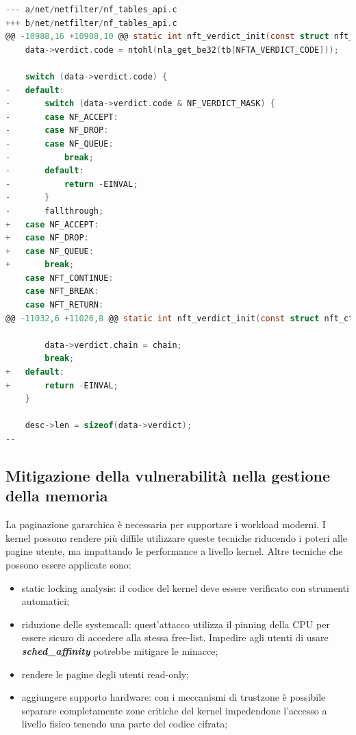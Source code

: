 \documentclass{article}
\begin{document}
\begin{lstlisting}[language=C,style=CStyle,caption="Commit applicato per mitigare la vulnerabilità"]
--- a/net/netfilter/nf_tables_api.c
+++ b/net/netfilter/nf_tables_api.c
@@ -10988,16 +10988,10 @@ static int nft_verdict_init(const struct nft_ctx *ctx, struct nft_data *data,
 	data->verdict.code = ntohl(nla_get_be32(tb[NFTA_VERDICT_CODE]));
 
 	switch (data->verdict.code) {
-	default:
-		switch (data->verdict.code & NF_VERDICT_MASK) {
-		case NF_ACCEPT:
-		case NF_DROP:
-		case NF_QUEUE:
-			break;
-		default:
-			return -EINVAL;
-		}
-		fallthrough;
+	case NF_ACCEPT:
+	case NF_DROP:
+	case NF_QUEUE:
+		break;
 	case NFT_CONTINUE:
 	case NFT_BREAK:
 	case NFT_RETURN:
@@ -11032,6 +11026,8 @@ static int nft_verdict_init(const struct nft_ctx *ctx, struct nft_data *data,
 
 		data->verdict.chain = chain;
 		break;
+	default:
+		return -EINVAL;
 	}
 
 	desc->len = sizeof(data->verdict);
--  
\end{lstlisting}

\subsection{Mitigazione della vulnerabilità nella gestione della memoria}
La paginazione gararchica è necessaria per supportare i workload moderni. I kernel possono 
rendere più diffile utilizzare queste tecniche riducendo i poteri alle pagine utente, 
ma impattando le performance a livello kernel. Altre tecniche che possono essere applicate sono:
\begin{itemize}
  \item static locking analysis: il codice del kernel deve essere verificato con strumenti 
    automatici;
  \item riduzione delle systemcall: quest'attacco utilizza il pinning della CPU per essere 
    sicuro di accedere alla stessa free-list. Impedire agli utenti di usare 
    \textbf{\textit{sched\_affinity}} potrebbe mitigare le minacce;
  \item rendere le pagine degli utenti read-only;
  \item aggiungere supporto hardware: con i meccanismi di trustzone è possibile separare 
    completamente zone critiche del kernel impedendone l'accesso a livello fisico tenendo una 
    parte del codice cifrata;
\end{itemize}
\clearpage

\nocite{*}


\end{document}
